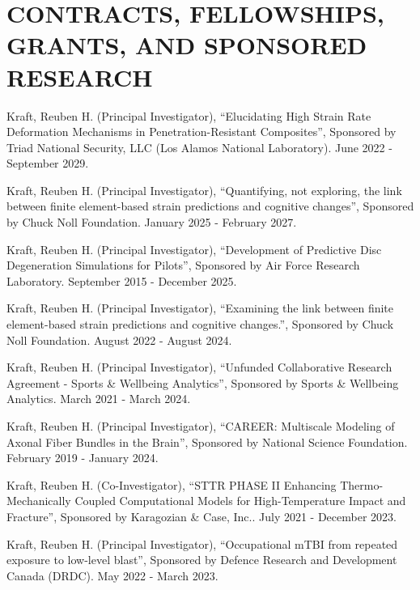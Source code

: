 \documentclass[a4paper,10pt]{article}
\begin{document}
\section*{CONTRACTS, FELLOWSHIPS, GRANTS, AND SPONSORED RESEARCH}

\noindent Kraft, Reuben H. (Principal Investigator), ``Elucidating High Strain Rate Deformation Mechanisms in Penetration-Resistant Composites'', Sponsored by Triad National Security, LLC (Los Alamos National Laboratory). June 2022 - September 2029.\vspace{0.25cm}

\noindent Kraft, Reuben H. (Principal Investigator), ``Quantifying, not exploring, the link between finite element-based strain predictions and cognitive changes'', Sponsored by Chuck Noll Foundation. January 2025 - February 2027.\vspace{0.25cm}

\noindent Kraft, Reuben H. (Principal Investigator), ``Development of Predictive Disc Degeneration Simulations for Pilots'', Sponsored by Air Force Research Laboratory. September 2015 - December 2025.\vspace{0.25cm}

\noindent Kraft, Reuben H. (Principal Investigator), ``Examining the link between finite element-based strain predictions and cognitive changes.'', Sponsored by Chuck Noll Foundation. August 2022 - August 2024.\vspace{0.25cm}

\noindent Kraft, Reuben H. (Principal Investigator), ``Unfunded Collaborative Research Agreement - Sports \& Wellbeing Analytics'', Sponsored by Sports \& Wellbeing Analytics. March 2021 - March 2024.\vspace{0.25cm}

\noindent Kraft, Reuben H. (Principal Investigator), ``CAREER: Multiscale Modeling of Axonal Fiber Bundles in the Brain'', Sponsored by National Science Foundation. February 2019 - January 2024.\vspace{0.25cm}

\noindent Kraft, Reuben H. (Co-Investigator), ``STTR PHASE II Enhancing Thermo-Mechanically Coupled Computational Models for High-Temperature Impact and Fracture'', Sponsored by Karagozian \& Case, Inc.. July 2021 - December 2023.\vspace{0.25cm}

\noindent Kraft, Reuben H. (Principal Investigator), ``Occupational mTBI from repeated exposure to low-level blast'', Sponsored by Defence Research and Development Canada (DRDC). May 2022 - March 2023.\vspace{0.25cm}
\end{document}
